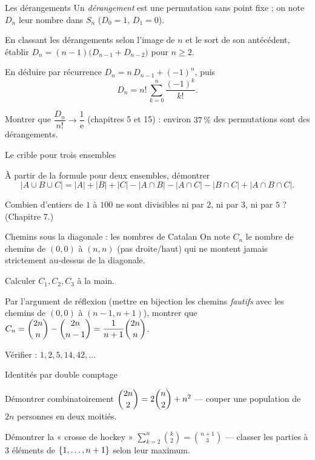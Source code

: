 
\begin{exercice}[3]{Les dérangements}
Un \emph{dérangement} est une permutation sans point fixe ; on note $D_n$
leur nombre dans $S_n$ ($D_0=1$, $D_1=0$).
\begin{questions}
  \item En classant les dérangements selon l'image de $n$ et le sort de
    son antécédent, établir
    $D_n=(n-1)\bigl(D_{n-1}+D_{n-2}\bigr)$ pour $n\geqslant2$.
  \item En déduire par récurrence $D_n=n\,D_{n-1}+(-1)^{n}$, puis
    \[
    D_n=n!\,\sum_{k=0}^{n}\frac{(-1)^{k}}{k!} .
    \]
  \item Montrer que $\dfrac{D_n}{n!}\to\dfrac{1}{\mathrm{e}}$
    (chapitres 5 et 15) : environ $37\,\%$ des permutations sont des
    dérangements.
\end{questions}
\end{exercice}

\begin{exercice}[3]{Le crible pour trois ensembles}
\begin{questions}
  \item À partir de la formule pour deux ensembles, démontrer
    \[
    |A\cup B\cup C|=|A|+|B|+|C|-|A\cap B|-|A\cap C|-|B\cap C|
    +|A\cap B\cap C| .
    \]
  \item Combien d'entiers de $1$ à $100$ ne sont divisibles ni par $2$,
    ni par $3$, ni par $5$ ? (Chapitre 7.)
\end{questions}
\end{exercice}

\begin{exercice}[3]{Chemins sous la diagonale : les nombres de Catalan}
On note $C_n$ le nombre de chemins de $(0,0)$ à $(n,n)$ (pas droite/haut)
qui ne montent jamais strictement au-dessus de la diagonale.
\begin{questions}
  \item Calculer $C_1,C_2,C_3$ à la main.
  \item Par l'argument de réflexion (mettre en bijection les chemins
    \emph{fautifs} avec les chemins de $(0,0)$ à $(n-1,n+1)$), montrer
    que $C_n=\dbinom{2n}{n}-\dbinom{2n}{n-1}=\dfrac{1}{n+1}\dbinom{2n}{n}$.
  \item Vérifier : $1,2,5,14,42,\dots$
\end{questions}
\end{exercice}

\begin{exercice}[3]{Identités par double comptage}
\begin{questions}
  \item Démontrer combinatoirement
    $\dbinom{2n}{2}=2\dbinom n2+n^{2}$ — couper une population de $2n$
    personnes en deux moitiés.
  \item Démontrer la « crosse de hockey »
    $\displaystyle\sum_{k=2}^{n}\binom k2=\binom{n+1}{3}$ — classer les
    parties à $3$ éléments de $\left\{1,\dots,n+1\right\}$ selon leur maximum.
\end{questions}
\end{exercice}

